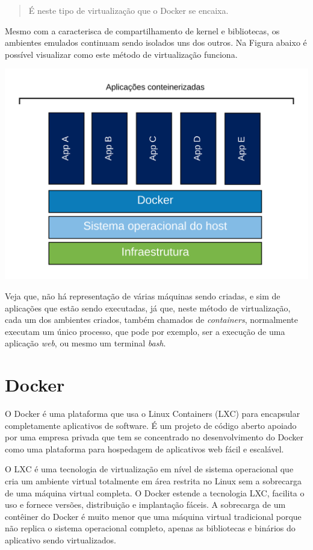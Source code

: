 \documentclass[]{article}
\begin{document}
\begin{quote}
É neste tipo de virtualização que o Docker se encaixa.
\end{quote}

Mesmo com a caracterisca de compartilhamento de kernel e bibliotecas, os ambientes emulados continuam sendo isolados uns dos outros. Na Figura abaixo é possível visualizar como este método de virtualização funciona.

\includegraphics{res/1_intro/container_overview.svg}

Veja que, não há representação de várias máquinas sendo criadas, e sim de aplicações que estão sendo executadas, já que, neste método de virtualização, cada um dos ambientes criados, também chamados de \emph{containers}, normalmente executam um único processo, que pode por exemplo, ser a execução de uma aplicação \emph{web}, ou mesmo um terminal \emph{bash}.

\hypertarget{docker}{%
\section{Docker 🐳}\label{docker}}

O Docker é uma plataforma que usa o Linux Containers (LXC) para encapsular completamente aplicativos de software. É um projeto de código aberto apoiado por uma empresa privada que tem se concentrado no desenvolvimento do Docker como uma plataforma para hospedagem de aplicativos web fácil e escalável.

O LXC é uma tecnologia de virtualização em nível de sistema operacional que cria um ambiente virtual totalmente em área restrita no Linux sem a sobrecarga de uma máquina virtual completa. O Docker estende a tecnologia LXC, facilita o uso e fornece versões, distribuição e implantação fáceis. A sobrecarga de um contêiner do Docker é muito menor que uma máquina virtual tradicional porque não replica o sistema operacional completo, apenas as bibliotecas e binários do aplicativo sendo virtualizados.
\end{document}
